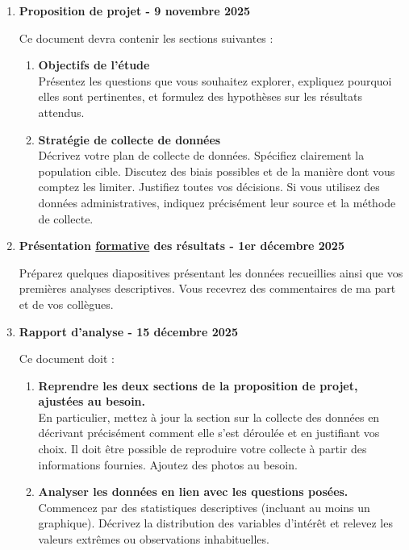 \documentclass[11pt,french]{article}
\begin{document}
\begin{enumerate} \itemsep 3mm
\item \textbf{Proposition de projet - 9 novembre 2025} 

Ce document devra contenir les sections suivantes :
\begin{enumerate}
\item[-] \textbf{Objectifs de l’étude}\\
Présentez les questions que vous souhaitez explorer, expliquez pourquoi elles sont pertinentes, et formulez des hypothèses sur les résultats attendus.
\item[-] \textbf{Stratégie de collecte de données}\\
Décrivez votre plan de collecte de données. Spécifiez clairement la population cible. Discutez des biais possibles et de la manière dont vous comptez les limiter. Justifiez toutes vos décisions. Si vous utilisez des données administratives, indiquez précisément leur source et la méthode de collecte.
\end{enumerate}

\item \textbf{Présentation \underline{formative} des résultats - 1er décembre 2025} 

Préparez quelques diapositives présentant les données recueillies ainsi que vos premières analyses descriptives. Vous recevrez des commentaires de ma part et de vos collègues.

\item \textbf{Rapport d’analyse - 15 décembre 2025} 

Ce document doit :
\begin{enumerate}
\item[-] \textbf{Reprendre les deux sections de la proposition de projet, ajustées au besoin.}\\
En particulier, mettez à jour la section sur la collecte des données en décrivant précisément comment elle s’est déroulée et en justifiant vos choix. Il doit être possible de reproduire votre collecte à partir des informations fournies. Ajoutez des photos au besoin.
\item[-] \textbf{Analyser les données en lien avec les questions posées.}\\
Commencez par des statistiques descriptives (incluant au moins un graphique). Décrivez la distribution des variables d’intérêt et relevez les valeurs extrêmes ou observations inhabituelles. 


\end{enumerate}
\end{enumerate}
\end{document}
